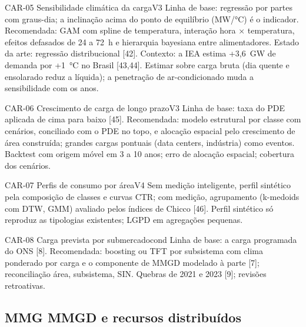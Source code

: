 \begin{ficha}{CAR-05 \textperiodcentered{} Sensibilidade climática da carga}{V3}
 Linha de base: regressão por partes com graus-dia; a
inclinação acima do ponto de equilíbrio (MW/°C) é o indicador. Recomendada:
GAM com spline de temperatura, interação hora × temperatura, efeitos
defasados de 24 a 72~h e hierarquia bayesiana entre alimentadores. Estado da
arte: regressão distribucional [42]. Contexto: a IEA estima +3,6~GW de demanda
por +1~°C no Brasil [43,44].
 Estimar sobre carga bruta (dia quente e ensolarado reduz
a líquida); a penetração de ar-condicionado muda a sensibilidade com os anos.
\end{ficha}

\begin{ficha}{CAR-06 \textperiodcentered{} Crescimento de carga de longo prazo}{V3}
 Linha de base: taxa do PDE aplicada de cima para baixo
[45]. Recomendada: modelo estrutural por classe com cenários, conciliado com
o PDE no topo, e alocação espacial pelo crescimento de área construída;
grandes cargas pontuais (data centers, indústria) como eventos.
 Backtest com origem móvel em 3 a 10 anos; erro de alocação
espacial; cobertura dos cenários.
\end{ficha}

\begin{ficha}{CAR-07 \textperiodcentered{} Perfis de consumo por área}{V4}
 Sem medição inteligente, perfil sintético pela composição
de classes e curvas CTR; com medição, agrupamento (k-medoids com DTW, GMM)
avaliado pelos índices de Chicco [46].
 Perfil sintético só reproduz as tipologias existentes;
LGPD em agregações pequenas.
\end{ficha}

\begin{ficha}{CAR-08 \textperiodcentered{} Carga prevista por submercado}{cond}
 Linha de base: a carga programada do ONS [8].
Recomendada: boosting ou TFT por subsistema com clima ponderado por carga e o
componente de MMGD modelado à parte [7]; reconciliação área, subsistema, SIN.
 Quebras de 2021 e 2023 [9]; revisões retroativas.
\end{ficha}

\subsection{MMG \textperiodcentered{} MMGD e recursos distribuídos}

